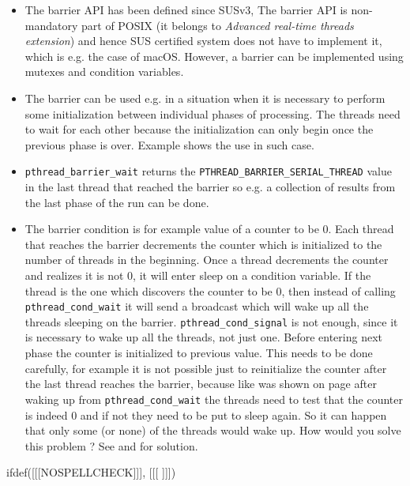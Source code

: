 \begin{itemize}
\item The barrier API has been defined since SUSv3,
The barrier API is non-mandatory part of POSIX (it belongs to
\emph{Advanced real-time threads extension}) and hence SUS certified system does
not have to implement it, which is e.g. the case of macOS.
However, a barrier can be implemented using mutexes and condition variables.
\item The barrier can be used e.g. in a situation when it is necessary to
perform some initialization between individual phases of processing.
The threads need to wait for each other because the initialization can only
begin once the previous phase is over.
Example  shows the use in such case.
\item \texttt{pthread\_barrier\_wait} returns
the \texttt{PTHREAD\_BARRIER\_SERIAL\_THREAD} value
in the last thread that reached the barrier so e.g. a collection of
results from the last phase of the run can be done.
\item The barrier condition is for example value of a counter to be 0.
Each thread that reaches the barrier decrements the counter which is
initialized to the number of threads in the beginning.
Once a thread decrements the counter and realizes it is not 0,
it will enter sleep on a condition variable.
If the thread is the one which discovers the counter to be 0, then instead of
calling \texttt{pthread\_cond\_wait} it will send a broadcast which will
wake up all the threads sleeping on the barrier.
\texttt{pthread\_cond\_signal} is not enough, since it is necessary to wake up
all the threads, not just one.
Before entering next phase the counter is initialized to previous value.
This needs to be done carefully, for example it is not possible just to
reinitialize the counter after the last thread reaches the barrier,
because like was shown on page \pageref{CONDITION_VARIABLES} after waking
up from \texttt{pthread\_cond\_wait} the threads need to test that the counter
is indeed 0 and if not they need to be put to sleep again. So it can happen
that only some (or none) of the threads would wake up.
How would you solve this problem ? See 
and  for solution.
\end{itemize}



ifdef([[[NOSPELLCHECK]]], [[[
]]])


